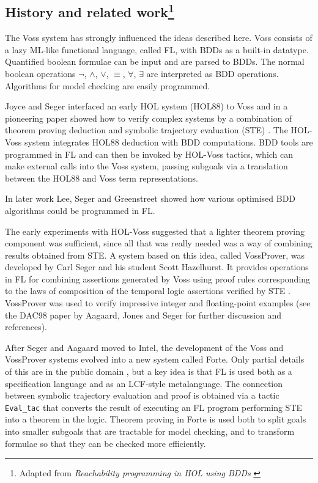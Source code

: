 \documentclass[12pt]{article}
\begin{document}
\subsection*{History and related work\footnote{Adapted from 
{\it Reachability programming in HOL using BDDs}
\cite{tphols2000-Gordon}}}\label{related}

The Voss system \cite{SegerVoss} has strongly influenced
the ideas described here. Voss consists of a lazy
ML-like functional language, called FL, with BDDs as a built-in datatype.
Quantified boolean formulae can be input and are parsed to BDDs.
The normal boolean operations $\neg$, $\wedge$, $\vee$, $\equiv$,
$\forall$, $\exists$ are interpreted as BDD operations.  
Algorithms for model checking are easily programmed.

Joyce and Seger interfaced an early HOL system (HOL88) to Voss and in
a pioneering paper showed how to verify complex systems by a
combination of theorem proving deduction and symbolic trajectory
evaluation (STE) \cite{JoyceSeger}. The HOL-Voss system integrates HOL88
deduction with BDD computations.  BDD tools are programmed in FL and
can then be invoked by HOL-Voss tactics, which can make external
calls into the Voss system, passing subgoals via a translation between
the HOL88 and Voss term representations.

In later work Lee, Seger and Greenstreet \cite{LeeGreenstreetSeger}
showed how various optimised BDD algorithms could be programmed in FL.

The early experiments with HOL-Voss suggested that a lighter theorem
proving component was sufficient, since all that was really needed was
a way of combining results obtained from STE. A system based on this
idea, called VossProver, was developed by Carl Seger and his student
Scott Hazelhurst. It provides operations in FL for combining
assertions generated by Voss using proof rules corresponding to the
laws of composition of the temporal logic assertions verified by STE
\cite{hazelhurst-kropfbook-97}.  
VossProver was used to verify
impressive integer and floating-point examples (see the DAC98
paper by Aagaard, Jones and Seger \cite{aagaard-dac-98} for further
discussion and references). 

After Seger and Aagaard moved to Intel, the development of the Voss and
VossProver systems evolved into a new system called Forte.  Only partial details
of this are in the public domain
\cite{oleary-itj-99,aagaard-tphols-99}, but a key idea is that FL is
used both as a specification language and as an LCF-style
metalanguage. The connection between symbolic trajectory evaluation
and proof is obtained via a tactic {\tt{Eval\_tac}} that converts the
result of executing an FL program performing STE into a theorem in the
logic. Theorem proving in Forte is used both to split goals into
smaller subgoals that are tractable for model checking, and to
transform formulae so that they can be checked more efficiently.
\end{document}
